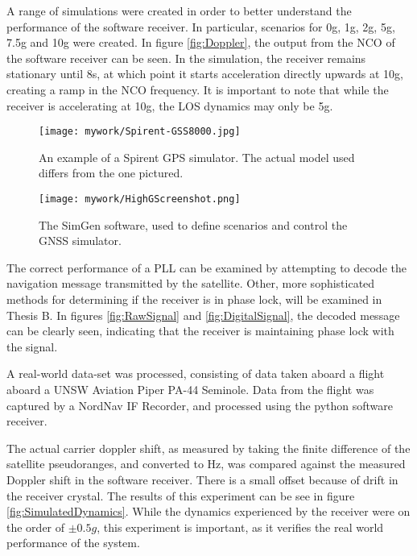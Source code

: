 A range of simulations were created in order to better understand the performance of the software receiver. In particular, scenarios for 0g, 1g, 2g, 5g, 7.5g and 10g were created. In figure \ref{fig:Doppler}, the output from the \ac{NCO} of the software receiver can be seen. In the simulation, the receiver remains stationary until 8s, at which point it starts acceleration directly upwards at 10g, creating a ramp in the \ac{NCO} frequency. It is important to note that while the receiver is accelerating at 10g, the \ac{LOS} dynamics may only be 5g. 

\begin{figure}[!htb] 
    \centering
    \texttt{[image: mywork/Spirent-GSS8000.jpg]} 
    \caption{An example of a Spirent \ac{GPS} simulator. The actual model used differs from the one pictured.}
    \label{fig:Spirent}
\end{figure}

\begin{figure}[!htb] 
    \centering
    \texttt{[image: mywork/HighGScreenshot.png]} 
    \caption{The SimGen software, used to define scenarios and control the \ac{GNSS} simulator.}
    \label{fig:HighGScreenshot}
\end{figure}


The correct performance of a \ac{PLL} can be examined by attempting to decode the navigation message transmitted by the satellite. Other, more sophisticated methods for determining if the receiver is in phase lock, will be examined in Thesis B. In figures \ref{fig:RawSignal} and \ref{fig:DigitalSignal}, the decoded message can be clearly seen, indicating that the receiver is maintaining phase lock with the signal.




A real-world data-set was processed, consisting of data taken aboard a flight aboard a UNSW Aviation Piper PA-44 Seminole. Data from the flight was captured by a NordNav IF Recorder, and processed using the python software receiver. 

The actual carrier doppler shift, as measured by taking the finite difference of the satellite pseudoranges, and converted to Hz, was compared against the measured Doppler shift in the software receiver. There is a small offset because of drift in the receiver crystal. The results of this experiment can be see in figure \ref{fig:SimulatedDynamics}. While the dynamics experienced by the receiver were on the order of $\pm 0.5g$, this experiment is important, as it verifies the real world performance of the system. 


